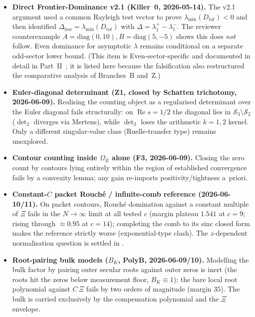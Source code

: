 \documentclass[12pt,a4paper]{article}
\theoremstyle{definition}
\theoremstyle{remark}
\begin{document}
\begin{itemize}
  \item \textbf{Direct Frontier-Dominance v2.1 (Killer~0, 2026-05-14).}
    The v2.1 argument used a common Rayleigh test vector to prove
    $\lambda_{\min}(D_{tot})<0$ and then identified
    $\Delta_{low}=\lambda_{\min}(D_{tot})$ with
    $\Delta=\lambda_1^+-\lambda_1^-$. The reviewer counterexample
    $A=\mathrm{diag}(0,10), B=\mathrm{diag}(5,-5)$ shows this does
    \emph{not} follow. Even dominance for asymptotic $\lambda$ remains
    conditional on a separate odd-sector lower bound. (This item is
    Even-sector-specific and documented in detail in
    Part~II~\cite{Geiger2026partII}; it is listed here because the
    falsification also restructured the comparative analysis of
    Branches~B and~Z.)

  \item \textbf{Euler-diagonal determinant (Z1, closed by Schatten
    trichotomy, 2026-06-09).} Realising the counting object as a
    regularised determinant over the Euler diagonal fails structurally:
    on $\operatorname{Re} s = 1/2$ the diagonal lies in
    $\mathcal{S}_3\setminus\mathcal{S}_2$ ($\det_2$ diverges via
    Mertens), while $\det_3$ loses the arithmetic $k=1,2$ kernel. Only a
    different singular-value class (Ruelle-transfer type) remains
    unexplored.

  \item \textbf{Contour counting inside $\Omega_E$ alone (F3,
    2026-06-09).} Closing the zero count by contours lying entirely
    within the region of established convergence fails by a convexity
    lemma; any gain re-imports positivity/tightness a~priori.

  \item \textbf{Constant-$C$ packet Rouch\'e / infinite-comb reference
    (2026-06-10/11).} On packet contours, Rouch\'e domination against a
    constant multiple of $\Xi$ fails in the $N\to\infty$ limit at all
    tested $c$ (margin plateau $1.541$ at $c=9$; rising through
    $\approx 0.95$ at $c=14$); completing the comb to its sinc closed
    form makes the reference strictly worse (exponential-type clash).
    The $z$-dependent normalisation question is settled in
    .

  \item \textbf{Root-pairing bulk models ($B_K$, PolyB, 2026-06-09/10).}
    Modelling the bulk factor by pairing outer secular roots against
    outer zeros is inert (the roots hit the zeros below measurement
    floor, $B_K \equiv 1$); the bare local root polynomial against
    $C\,\Xi$ fails by two orders of magnitude (margin $35$). The bulk is
    carried exclusively by the compensation polynomial and the $\Xi$
    envelope.
\end{itemize}
\end{document}
